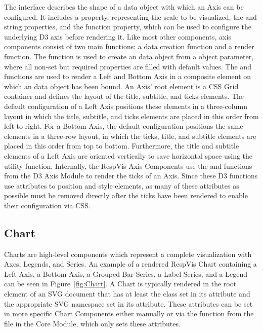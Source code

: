 The  interface describes the shape of a data object with
which an Axis can be configured.  It includes a  property,
representing the scale to be visualized, the  and
 string properties, and the 
function property, which can be used to configure the underlying D3
axis before rendering it. Like most other components, axis components
consist of two main functions: a data creation function and a render
function. The  function is used to create an
 data object from a  object parameter,
where all non-set but required properties are filled with default
values. The  and 
functions are used to render a Left and Bottom Axis in a composite
element on which an  data object has been bound.  An Axis'
root element is a CSS Grid container and defines the layout of the
title, subtitle, and ticks elements.  The default configuration of a
Left Axis positions these elements in a three-column layout in which
the title, subtitle, and ticks elements are placed in this order from
left to right. For a Bottom Axis, the default configuration positions
the same elements in a three-row layout, in which the ticks, title,
and subtitle elements are placed in this order from top to bottom.
Furthermore, the title and subtitle elements of a Left Axis are
oriented vertically to save horizontal space using the
 utility function. Internally, the RespVis Axis
Components use the  and  functions
from the D3 Axis Module \parencite{D3Axis} to render the ticks of an
Axis. Since these D3 functions use attributes to position and style
elements, as many of these attributes as possible must be removed
directly after the ticks have been rendered to enable their
configuration via CSS.






\subsection{Chart}
\label{sec:Chart}

Charts are high-level components which represent a complete
visualization with Axes, Legends, and Series. An example of a rendered
RespVis Chart containing a Left Axis, a Bottom Axis, a Grouped Bar
Series, a Label Series, and a Legend can be seen in
Figure~\ref{fig:Chart}. A Chart is typically rendered in the root
 element of an SVG document that has at least the
 class set in its  attribute and the
appropriate SVG namespace set in its  attribute. These
attributes can be set in more specific Chart Components either
manually or via the  function from the
 file in the Core Module, which only sets these
attributes.


